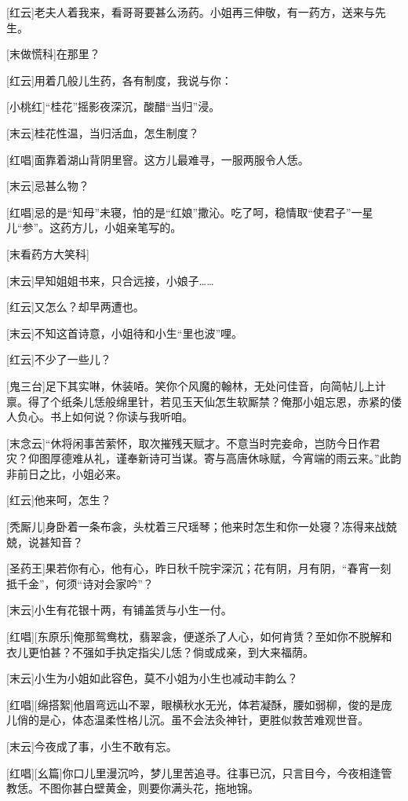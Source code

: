 \documentclass{book}
\begin{document}
[红云]老夫人着我来，看哥哥要甚么汤药。小姐再三伸敬，有一药方，送来与先生。

[末做慌科]在那里？

[红云]用着几般儿生药，各有制度，我说与你：

[小桃红]``桂花''摇影夜深沉，酸醋``当归''浸。

[末云]桂花性温，当归活血，怎生制度？

[红唱]面靠着湖山背阴里窨。这方儿最难寻，一服两服令人恁。

[末云]忌甚么物？

[红唱]忌的是``知母''未寝，怕的是``红娘''撒沁。吃了呵，稳情取``使君子''一星儿``参''。这药方儿，小姐亲笔写的。

[末看药方大笑科]

[末云]早知姐姐书来，只合远接，小娘子……

[红云]又怎么？却早两遭也。

[末云]不知这首诗意，小姐待和小生``里也波''哩。

[红云]不少了一些儿？

[鬼三台]足下其实啉，休装㖔。笑你个风魔的翰林，无处问佳音，向简帖儿上计禀。得了个纸条儿恁般绵里针，若见玉天仙怎生软厮禁？俺那小姐忘恩，赤紧的偻人负心。书上如何说？你读与我听咱。

[末念云]``休将闲事苦萦怀，取次摧残天赋才。不意当时完妾命，岂防今日作君灾？仰图厚德难从礼，谨奉新诗可当谋。寄与高唐休咏赋，今宵端的雨云来。''此韵非前日之比，小姐必来。

[红云]他来呵，怎生？

[秃厮儿]身卧着一条布衾，头枕着三尺瑶琴；他来时怎生和你一处寝？冻得来战兢兢，说甚知音？

[圣药王]果若你有心，他有心，昨日秋千院宇深沉；花有阴，月有阴，``春宵一刻抵千金''，何须``诗对会家吟''？

[末云]小生有花银十两，有铺盖赁与小生一付。

[红唱][东原乐]俺那鸳鸯枕，翡翠衾，便遂杀了人心，如何肯赁？至如你不脱解和衣儿更怕甚？不强如手执定指尖儿恁？倘或成亲，到大来福荫。

[末云]小生为小姐如此容色，莫不小姐为小生也减动丰韵么？

[红唱][绵搭絮]他眉弯远山不翠，眼横秋水无光，体若凝酥，腰如弱柳，俊的是庞儿俏的是心，体态温柔性格儿沉。虽不会法灸神针，更胜似救苦难观世音。

[末云]今夜成了事，小生不敢有忘。

[红唱][幺篇]你口儿里漫沉吟，梦儿里苦追寻。往事已沉，只言目今，今夜相逢管教恁。不图你甚白壁黄金，则要你满头花，拖地锦。
\end{document}
